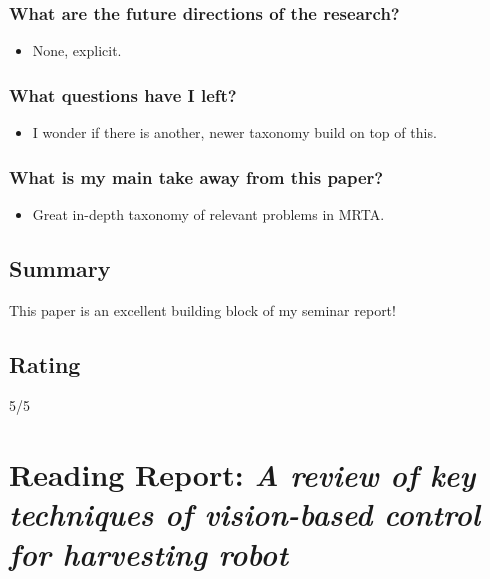     \subsubsection*{What are the future directions of the research?}
    \begin{itemize}
        \item None, explicit. 
    \end{itemize}
    \subsubsection*{What questions have I left?}
    \begin{itemize}
        \item I wonder if there is another, newer taxonomy build on top of this.
    \end{itemize}
    \subsubsection*{What is my main take away from this paper?}
    \begin{itemize}
        \item Great in-depth taxonomy of relevant problems in MRTA.
    \end{itemize}
    
    \subsection*{Summary}
    This paper is an excellent building block of my seminar report!
    \subsection*{Rating}
    5/5

    \newpage
    
    
    \section{Reading Report: \emph{A review of key techniques of vision-based control for harvesting robot}}
    \cite{Zhao2016}
    
